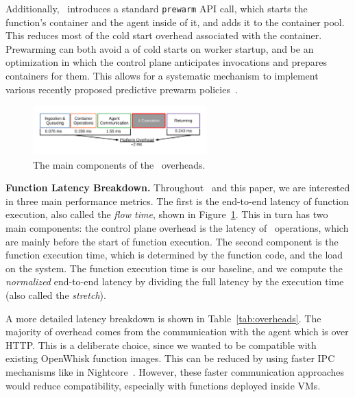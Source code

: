 Additionally, \sysname~introduces a standard \texttt{prewarm}  API call, which starts the function's container and the agent inside of it, and adds it to the container pool.
This reduces most of the cold start overhead associated with the container.
Prewarming can both avoid a  of cold starts on worker startup, and be an optimization in which the control plane anticipates invocations and prepares containers for them. 
This allows for a systematic mechanism to implement various recently proposed predictive prewarm policies~\cite{roy2022icebreaker, shahrad_serverless_2020, silva_prebaking_2020}. 





\begin{figure}
\centering 
\includegraphics[width=0.6\textwidth]{iluvatar/figs/OverheadTimeline.pdf}
\caption{The main components of the \sysname~overheads.}
\label{fig:timeline-flow}
\end{figure}


\noindent \textbf{Function Latency Breakdown.}
Throughout \sysname~and this paper, we are interested in three main performance metrics. 
The first is the end-to-end latency of function execution, also called the \emph{flow time}, shown in Figure~\ref{fig:timeline-flow}.
This in turn has two main components: the control plane overhead is the latency of \sysname~operations, which are mainly before the start of function execution.
The second component is the function execution time, which is determined by the function code, and the load on the system.
The function execution time is our baseline, and we compute the \emph{normalized} end-to-end latency by dividing the full latency by the execution time (also called the \emph{stretch}). 

A more detailed latency breakdown is shown in Table~\ref{tab:overheads}.
The majority of overhead comes from the communication with the agent which is over HTTP. 
This is a deliberate choice, since we wanted to be compatible with existing OpenWhisk function images.
This can be reduced by using faster IPC mechanisms like in Nightcore~\cite{jia2021nightcore}. 
However, these faster communication approaches would reduce compatibility, especially with functions deployed inside VMs.

